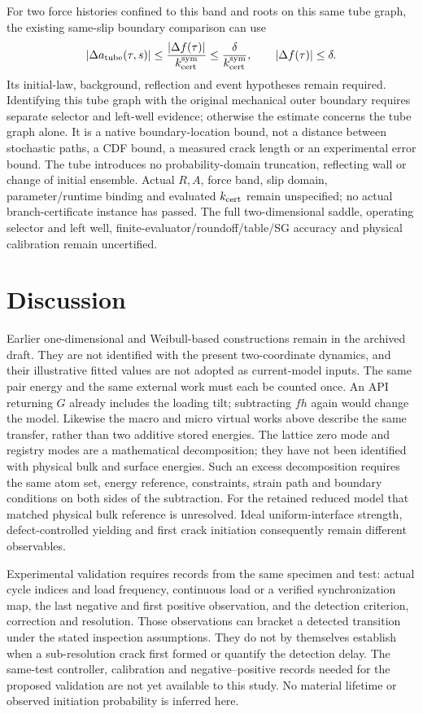 \documentclass[11pt]{article}
\begin{document}
For two force histories confined to this band and roots on this same tube
graph, the existing same-slip boundary comparison can use
\begin{equation}
 |\Delta a_{\rm tube}(\tau,s)|
 \leq\frac{|\Delta f(\tau)|}{k_{\rm cert}^{\rm sym}}
 \leq\frac{\delta}{k_{\rm cert}^{\rm sym}},
 \qquad |\Delta f(\tau)|\leq\delta .
\end{equation}
Its initial-law, background, reflection and event hypotheses remain required.
Identifying this tube graph with the original mechanical outer boundary
requires separate selector and left-well evidence; otherwise the estimate
concerns the tube graph alone. It is a native boundary-location bound,
not a distance between stochastic paths, a CDF bound, a measured crack
length or an experimental error bound.
The tube introduces no probability-domain truncation, reflecting wall or
change of initial ensemble. Actual $R,A$, force band, slip domain,
parameter/runtime binding and evaluated $k_{\rm cert}$ remain unspecified;
no actual branch-certificate instance has passed.
The full two-dimensional saddle, operating selector and left well,
finite-evaluator/roundoff/table/SG accuracy and physical calibration remain
uncertified.

\section{Discussion}
Earlier one-dimensional and Weibull-based constructions remain in the archived
draft. They are not identified with the present two-coordinate dynamics, and
their illustrative fitted values are not adopted as current-model inputs.
The same pair energy and the same external work must each be counted once.
An API returning $G$ already includes the loading tilt; subtracting $fh$ again
would change the model. Likewise the macro and micro virtual works above
describe the same transfer, rather than two additive stored energies.
The lattice zero mode and registry modes are a mathematical decomposition;
they have not been identified with physical bulk and surface energies.
Such an excess decomposition requires the same atom set, energy reference,
constraints, strain path and boundary conditions on both sides of the subtraction.
For the retained reduced model that matched physical bulk reference is unresolved.
Ideal uniform-interface strength, defect-controlled yielding and first crack
initiation consequently remain different observables.

Experimental validation requires records from the same specimen and test:
actual cycle indices and load frequency, continuous load or a verified
synchronization map, the last negative and first positive observation,
and the detection criterion, correction and resolution.
Those observations can bracket a detected transition under the stated inspection
assumptions. They do not by themselves establish when a sub-resolution crack
first formed or quantify the detection delay. The same-test controller, calibration and negative--positive records
needed for the proposed validation are not yet available to this study.
No material lifetime or observed initiation probability is inferred here.
\end{document}
